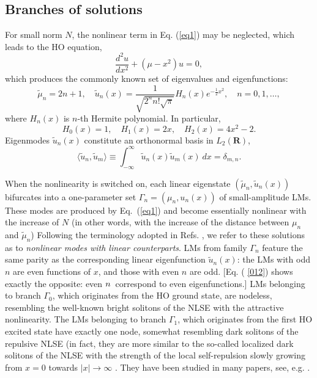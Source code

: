 \documentclass[aps,preprint,showkeys,
]{revtex4}
\begin{document}
\label{SmAmpl}

\subsection{Branches of solutions}

\label{Gammas}

For small norm $N$, the nonlinear term in Eq. (\ref{eq1}) may be neglected,
which leads to the HO equation,
\begin{equation}
\frac{d^{2}u}{dx^{2}}+(\mu -x^{2})u=0,  \label{LinGPE}
\end{equation}%
which produces the commonly known set of eigenvalues and eigenfunctions:%
\begin{equation}
\tilde{\mu}_{n}=2n+1,\quad \tilde{u}_{n}(x)=\frac{1}{\sqrt{2^{n}n!\sqrt{\pi }%
}}H_{n}(x)e^{-\frac{1}{2}x^{2}},\quad n=0,1,\ldots ,  \label{eq:GH}
\end{equation}%
where $H_{n}(x)$ is $n$-th Hermite polynomial. In particular,%
\begin{equation}
H_{0}(x)=1,\quad H_{1}(x)=2x,\quad H_{2}(x)=4x^{2}-2.  \label{012}
\end{equation}%
Eigenmodes $\tilde{u}_{n}(x)$ constitute an orthonormal basis in $L_{2}(%
\mathbf{R})$,
\begin{equation}
\langle \tilde{u}_{n},\tilde{u}_{m}\rangle \equiv \int_{-\infty }^{\infty }%
\tilde{u}_{n}(x)\tilde{u}_{m}(x)~dx=\delta _{m,n}.
\end{equation}

When the nonlinearity is switched on, each linear eigenstate $(\tilde{\mu}%
_{n},\tilde{u}_{n}(x))$ bifurcates into a one-parameter set $\Gamma
_{n}=(\mu _{n},u_{n}(x))$ of small-amplitude LMs. These modes are produced
by Eq.~(\ref{eq1}) and become essentially nonlinear with the increase of $N$
(in other words, with the increase of the distance between $\mu _{n}$ and $%
\tilde{\mu}_{n}$) Following the terminology adopted in Refs. \cite{AMP,AP},
we refer to these solutions as to \textit{nonlinear modes with linear
counterparts}. LMs from family $\Gamma _{n}$ feature the same parity as the
corresponding linear eigenfunction $\tilde{u}_{n}(x)$: the LMs with odd $n$
are even functions of $x$, and those with even $n$ are odd. {\LARGE [Eq. (%
\ref{012}) shows exactly the opposite: even }${\LARGE n}${\LARGE \
correspond to even eigenfunctions.]} LMs belonging to branch $\Gamma _{0}$,
which originates from the HO ground state, are nodeless, resembling the
well-known bright solitons of the NLSE with the attractive nonlinearity.
The LMs belonging to branch $\Gamma _{1}$, which originates from the first
HO excited state have exactly one node, somewhat resembling dark solitons of
the repulsive NLSE (in fact, they are more similar to the so-called
localized dark solitons of the NLSE with the strength of the local
self-repulsion slowly growing from $x=0$ towards $|x|\rightarrow \infty $
\cite{Zeng}.
They have been studied in many papers, see, e.g. \cite{WLK13,K17,C10,PFK05}.
\end{document}
